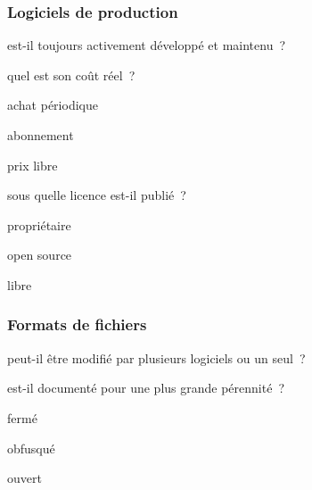 \subsubsection{Logiciels de production}

\begin{itmz}
\item{est-il toujours activement développé et maintenu ?}
\item{quel est son coût réel ?
    \begin{itmz}
    \item{achat périodique}
    \item{abonnement}
    \item{prix libre}
    \end{itmz}
}
\item{sous quelle licence est-il publié ?
    \begin{itmz}
    \item{propriétaire}
    \item{open source}
    \item{libre}
    \end{itmz}
}
\end{itmz}

\subsubsection{Formats de fichiers}

\begin{itmz}
\item{peut-il être modifié par plusieurs logiciels ou un seul ?}
\item{est-il documenté pour une plus grande pérennité ?
    \begin{itmz}
    \item{fermé}
    \item{obfusqué}
    \item{ouvert}
    \end{itmz}
}
\end{itmz}

\pagebreak
